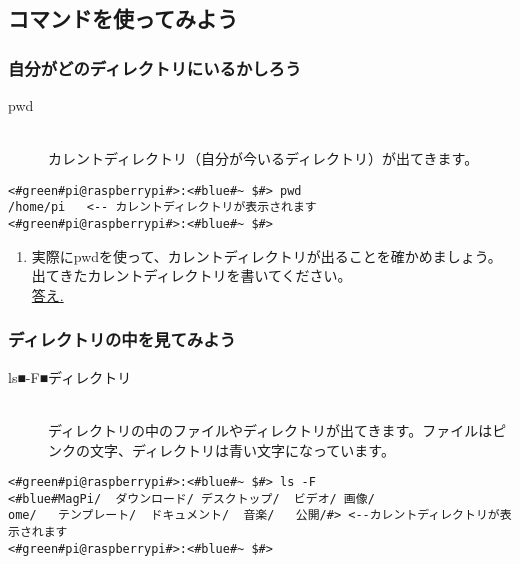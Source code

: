\subsection{コマンドを使ってみよう}
\subsubsection{自分がどのディレクトリにいるかしろう}

\begin{description}
\item[pwd]\mbox{}\\
 カレントディレクトリ（自分が今いるディレクトリ）が出てきます。
\end{description}

\begin{lstlisting}[caption=pwdコマンドの例,label=pwdtest]
<#green#pi@raspberrypi#>:<#blue#~ $#> pwd
/home/pi   <-- カレントディレクトリが表示されます
<#green#pi@raspberrypi#>:<#blue#~ $#>
\end{lstlisting}

\begin{tcolorbox}[title=\useOmetoi]

\begin{enumerate}
 \item 実際にpwdを使って、カレントディレクトリが出ることを確かめましょう。出てきたカレントディレクトリを書いてください。\\
\underline{答え.\hspace{0.8\linewidth}}
\end{enumerate}
\end{tcolorbox}

\subsubsection{ディレクトリの中を見てみよう}

\begin{description}
\item[ls■-F■ディレクトリ]\mbox{}\\
ディレクトリの中のファイルやディレクトリが出てきます。ファイルはピンクの文字、ディレクトリは青い文字になっています。
\end{description}

\begin{lstlisting}[caption=ls -F コマンドの例,label=lsFtest]
<#green#pi@raspberrypi#>:<#blue#~ $#> ls -F
<#blue#MagPi/  ダウンロード/ デスクトップ/  ビデオ/ 画像/
ome/   テンプレート/  ドキュメント/  音楽/   公開/#> <--カレントディレクトリが表示されます
<#green#pi@raspberrypi#>:<#blue#~ $#>
\end{lstlisting}

